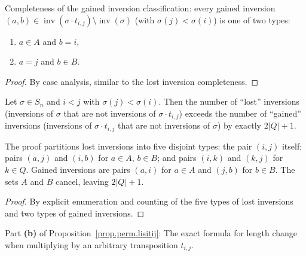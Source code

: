 \begin{lemma}
\label{lem.perm.gained_inversion_complete}
\leanhelper
\leanok
Completeness of the gained inversion classification:
every gained inversion $(a,b) \in \operatorname{inv}(\sigma \cdot t_{i,j}) \setminus \operatorname{inv}(\sigma)$
(with $\sigma(j) < \sigma(i)$) is one of two types:
\begin{enumerate}
\item $a \in A$ and $b = i$,
\item $a = j$ and $b \in B$.
\end{enumerate}
\end{lemma}

\begin{proof}
By case analysis, similar to the lost inversion completeness.
\end{proof}

\begin{lemma}
\label{lem.perm.lost-minus-gained}
\leanhelper
\leanok
Let $\sigma \in S_n$ and $i < j$ with $\sigma(j) < \sigma(i)$.
Then the number of ``lost'' inversions (inversions of $\sigma$ that are not
inversions of $\sigma \cdot t_{i,j}$) exceeds the number of ``gained'' inversions
(inversions of $\sigma \cdot t_{i,j}$ that are not inversions of $\sigma$)
by exactly $2|Q| + 1$.

The proof partitions lost inversions into five disjoint types:
the pair $(i,j)$ itself; pairs $(a,j)$ and $(i,b)$ for $a \in A$, $b \in B$;
and pairs $(i,k)$ and $(k,j)$ for $k \in Q$.
Gained inversions are pairs $(a,i)$ for $a \in A$ and $(j,b)$ for $b \in B$.
The sets $A$ and $B$ cancel, leaving $2|Q|+1$.
\end{lemma}

\begin{proof}
\leanok
By explicit enumeration and counting of the five types of lost inversions
and two types of gained inversions.
\end{proof}

\begin{theorem}
\label{prop.perm.lisitij.b}
\leanhelper
\leanok
Part \textbf{(b)} of Proposition~\ref{prop.perm.lisitij}: The exact formula for length change
when multiplying by an arbitrary transposition $t_{i,j}$.
\end{theorem}

